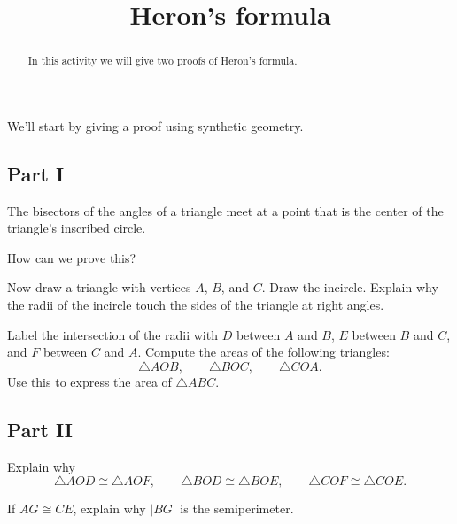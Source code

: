 \documentclass[nooutcomes]{ximera}
\title{Heron's formula}
\begin{document}
\begin{abstract}
In this activity we will give two proofs of Heron's formula.
\end{abstract}
\maketitle


We'll start by giving a proof using synthetic geometry. 

\subsection*{Part I}

\begin{proposition}
The bisectors of the angles of a triangle meet at a point that is the center of the triangle's inscribed circle.
\end{proposition}

\begin{question}
How can we prove this?
\end{question}

\begin{question}
Now draw a triangle with vertices $A$, $B$, and $C$. Draw the incircle. Explain why the radii of the incircle touch the sides of the triangle at right angles. 
\end{question}

\begin{question}
Label the intersection of the radii with $D$ between $A$ and $B$, $E$ between $B$ and $C$, and $F$ between $C$ and $A$. Compute the areas of the following triangles:
\[
\triangle AOB,\qquad \triangle BOC,\qquad \triangle COA.
\]
Use this to express the area of $\triangle ABC$. 
\end{question}

\subsection*{Part II}

\begin{question}
Explain why
\[
\triangle AOD \cong \triangle AOF,\qquad
\triangle BOD \cong \triangle BOE,\qquad
\triangle COF \cong \triangle COE.
\]
\end{question}


\begin{question}
If $AG \cong CE$, explain why $|BG|$ is the semiperimeter. 
\end{question}
\end{document}
